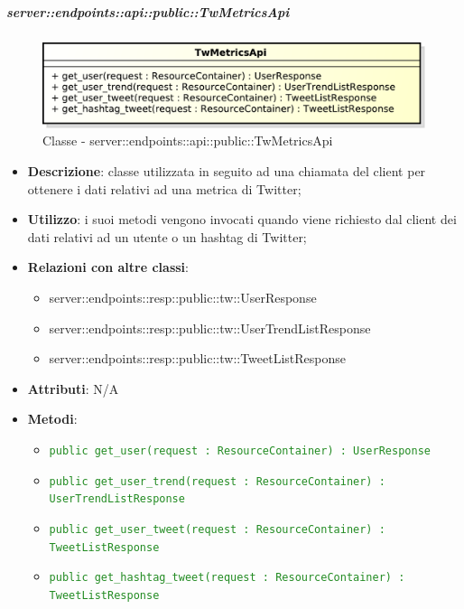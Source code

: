     \subparagraph{server::endpoints::api::public::TwMetricsApi} %
    \label{subp:bdsm_app_server_endpoints_api_public_twmetricsapi}
	\begin{figure}[!htbp]
		\centering
		\centerline{\includegraphics[scale=0.6]{./images/server/classes/endpoints/tw_metrics_api.pdf}}
		\caption{Classe - server::endpoints::api::public::TwMetricsApi}
	\end{figure}
    \begin{itemize}
      \item \textbf{Descrizione}: classe utilizzata in seguito ad una chiamata del client per ottenere i dati relativi ad una metrica di Twitter;
      \item \textbf{Utilizzo}: i suoi metodi vengono invocati quando viene richiesto dal client dei dati relativi ad un utente o un hashtag di Twitter;
      \item \textbf{Relazioni con altre classi}:
        \begin{itemize}
          \item server::endpoints::resp::public::tw::UserResponse
          \item server::endpoints::resp::public::tw::UserTrendListResponse
          \item server::endpoints::resp::public::tw::TweetListResponse
        \end{itemize}
		\item \textbf{Attributi}: N/A
		\item \textbf{Metodi}:
			\begin{itemize}
				\item \textcolor{forestgreen}{\texttt{public get\_user(request : ResourceContainer) : UserResponse}}
				\item \textcolor{forestgreen}{\texttt{public get\_user\_trend(request : ResourceContainer) : UserTrendListResponse}}
				\item \textcolor{forestgreen}{\texttt{public get\_user\_tweet(request : ResourceContainer) : TweetListResponse}}
				\item \textcolor{forestgreen}{\texttt{public get\_hashtag\_tweet(request : ResourceContainer) : TweetListResponse}}
			\end{itemize}
      \end{itemize}

